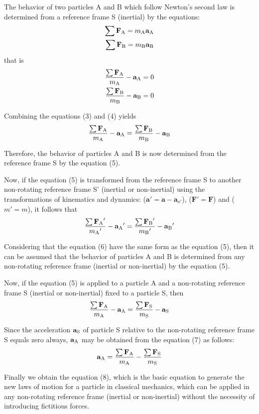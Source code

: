 \documentclass[12pt]{article}
\newcommand{\rt}{'}
\newcommand{\mm}{m}
\newcommand{\rot}{_{o'}}
\newcommand{\vA}{\mathbf{a}}
\newcommand{\vF}{\mathbf{F}}
\newcommand{\ra}{_{\mbox {\scriptsize A}}}
\newcommand{\rb}{_{\mbox {\scriptsize B}}}
\newcommand{\rs}{_{\mbox {\scriptsize S}}}
\begin{document}
\par The behavior of two particles A and B which follow Newton's second law is determined from a reference frame S (inertial) by the equations:
\begin{eqnarray}
\sum \vF\ra = \mm\ra\vA\ra \\
\sum \vF\rb = \mm\rb\vA\rb
\end{eqnarray}
\noindent that is
\begin{eqnarray}
\frac{\sum \vF\ra}{\mm\ra} - \vA\ra = 0 \\
\frac{\sum \vF\rb}{\mm\rb} - \vA\rb = 0
\end{eqnarray}
\par Combining the equations (3) and (4) yields
\begin{eqnarray}
\frac{\sum \vF\ra}{\mm\ra} - \vA\ra = \frac{\sum \vF\rb}{\mm\rb} - \vA\rb
\end{eqnarray}
\par Therefore, the behavior of particles A and B is now determined from the reference frame S by the equation (5).
\smallskip
\par Now, if the equation (5) is transformed from the reference frame S to another non-rotating reference frame S' (inertial or non-inertial) using the transformations of kinematics and \hbox {dynamics:} ($\vA\rt = \vA - \vA\rot$), ($\vF\rt = \vF$) and ($\mm\rt = \mm$), it follows that
\begin{eqnarray}
\frac{\sum {\vF\ra}\rt}{{\mm\ra}\rt} - {\vA\ra}\rt = \frac{\sum {\vF\rb}\rt}{{\mm\rb}\rt} - {\vA\rb}\rt
\end{eqnarray}
\par Considering that the equation (6) have the same form as the equation (5), then it can be assumed that the behavior of particles A and B is determined from any non-rotating reference frame (inertial or non-inertial) by the equation (5).
\smallskip
\par Now, if the equation (5) is applied to a particle A and a non-rotating reference frame S (inertial or non-inertial) fixed to a particle S, then
\begin{eqnarray}
\frac{\sum \vF\ra}{\mm\ra} - \vA\ra = \frac{\sum \vF\rs}{\mm\rs} - \vA\rs
\end{eqnarray}
\par Since the acceleration $\vA\rs$ of particle S relative to the non-rotating reference frame S equals zero always, $\vA\ra$ may be obtained from the equation (7) as follows:
\begin{eqnarray}
\vA\ra = \frac{\sum \vF\ra}{\mm\ra} - \frac{\sum \vF\rs}{\mm\rs}
\end{eqnarray}
\par Finally we obtain the equation (8), which is the basic equation to generate the new laws of motion for a particle in classical mechanics, which can be applied in any non-rotating reference frame (inertial or non-inertial) without the necessity of introducing fictitious forces.
\end{document}
